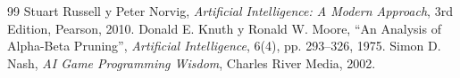 \documentclass[a4paper,12pt,openany]{book}
\begin{document}
% 

\newpage

\begin{thebibliography}{99}
     Stuart Russell y Peter Norvig, \textit{Artificial Intelligence: A Modern Approach}, 3rd Edition, Pearson, 2010.
     Donald E. Knuth y Ronald W. Moore, ``An Analysis of Alpha-Beta Pruning'', \textit{Artificial Intelligence}, 6(4), pp. 293–326, 1975.
     Simon D. Nash, \textit{AI Game Programming Wisdom}, Charles River Media, 2002.
    \end{thebibliography}
    
\end{document}
